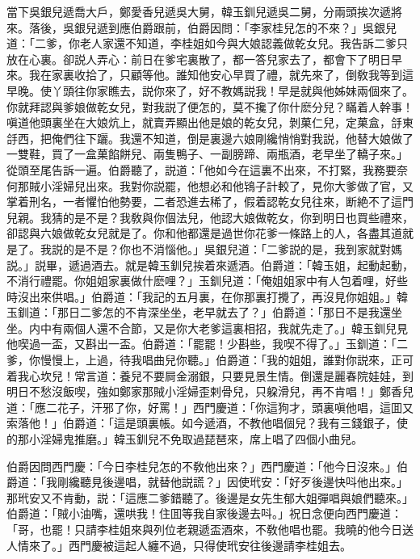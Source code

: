 當下吳銀兒遞喬大戶，鄭愛香兒遞吳大舅，韓玉釧兒遞吳二舅，分兩頭挨次遞將來。落後，吳銀兒遞到應伯爵跟前，伯爵因問：「李家桂兒怎的不來？」吳銀兒道：「二爹，你老人家還不知道，李桂姐如今與大娘認義做乾女兒。我告訴二爹只放在心裏。卻説人弄心：前日在爹宅裏散了，都一答兒家去了，都會下了明日早來。我在家裏收拾了，只顧等他。誰知他安心早買了禮，就先來了，倒敎我等到這早晚。使丫頭往你家瞧去，説你來了，好不教媽説我！早是就與他姊妹兩個來了。你就拜認與爹娘做乾女兒，對我説了便怎的，莫不攙了你什麽分兒？瞞着人幹事！嗔道他頭裏坐在大娘炕上，就賣弄顯出他是娘的乾女兒，剝菓仁兒，定菓盒，㧱東㧱西，把俺們往下躧。我還不知道，倒是裏邊六娘剛纔悄悄對我説，他替大娘做了一雙鞋，買了一盒菓餡餅兒、兩隻鴨子、一副膀蹄、兩瓶酒，老早坐了轎子來。」從頭至尾告訴一遍。伯爵聽了，説道：「他如今在這裏不出來，不打緊，我務要奈何那賊小淫婦兒出來。我對你説罷，他想必和他鴇子計較了，見你大爹做了官，又掌着刑名，一者懼怕他勢要，二者恐進去稀了，假着認乾女兒往來，断絶不了這門兒親。我猜的是不是？我敎與你個法兒，他認大娘做乾女，你到明日也買些禮來，卻認與六娘做乾女兒就是了。你和他都還是過世你花爹一條路上的人，各盡其道就是了。我説的是不是？你也不消惱他。」吳銀兒道：「二爹説的是，我到家就對媽説。」説畢，遞過酒去。就是韓玉釧兒挨着來遞酒。伯爵道：「韓玉姐，起動起動，不消行禮罷。你姐姐家裏做什麽哩？」玉釧兒道：「俺姐姐家中有人包着哩，好些時沒出來供唱。」伯爵道：「我記的五月裏，在你那裏打攪了，再沒見你姐姐。」韓玉釧道：「那日二爹怎的不肯深坐坐，老早就去了？」伯爵道：「那日不是我還坐坐。内中有兩個人還不合節，又是你大老爹這裏相招，我就先走了。」韓玉釧兒見他喫過一盃，又斟出一盃。伯爵道：「罷罷！少斟些，我喫不得了。」玉釧道：「二爹，你慢慢上，上過，待我唱曲兒你聽。」伯爵道：「我的姐姐，誰對你説來，正可着我心坎兒！常言道：養兒不要屙金溺銀，只要見景生情。倒還是麗春院娃娃，到明日不愁沒飯喫，強如鄭家那賊小淫婦歪剌骨兒，只躱滑兒，再不肯唱！」鄭香兒道：「應二花子，汗邪了你，好罵！」西門慶道：「你這狗才，頭裏嗔他唱，這囬又索落他！」伯爵道：「這是頭裏帳。如今遞酒，不教他唱個兒？我有三錢銀子，使的那小淫婦鬼推磨。」韓玉釧兒不免取過琵琶來，席上唱了四個小曲兒。

伯爵因問西門慶：「今日李桂兒怎的不敎他出來？」西門慶道：「他今日沒來。」伯爵道：「我剛纔聽見後邊唱，就替他説謊？」因使玳安：「好歹後邊快呌他出來。」那玳安又不肯動，説：「這應二爹錯聽了。後邊是女先生郁大姐彈唱與娘們聽來。」伯爵道：「賊小油嘴，還哄我！住囬等我自家後邊去呌。」祝日念便向西門慶道：「哥，也罷！只請李桂姐來與列位老親遞盃酒來，不敎他唱也罷。我曉的他今日送人情來了。」西門慶被這起人纏不過，只得使玳安往後邊請李桂姐去。

